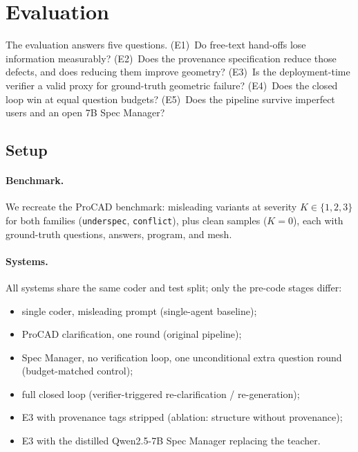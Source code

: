 \section{Evaluation}\label{sec:evaluation}

The evaluation answers five questions. (E1)~Do free-text hand-offs lose
information measurably? (E2)~Does the provenance specification reduce those
defects, and does reducing them improve geometry? (E3)~Is the
deployment-time verifier a valid proxy for ground-truth geometric failure?
(E4)~Does the closed loop win at equal question budgets? (E5)~Does the
pipeline survive imperfect users and an open 7B Spec Manager?

\subsection{Setup}\label{sec:evaluation:setup}

\paragraph{Benchmark.}
We recreate the ProCAD benchmark: misleading variants at severity
$K{\in}\{1,2,3\}$ for both families (\texttt{underspec},
\texttt{conflict}), plus clean samples ($K{=}0$), each with
ground-truth questions, answers, program, and mesh.

\paragraph{Systems.}
All systems share the same coder and test split; only the pre-code stages
differ:
\begin{itemize}\setlength\itemsep{0.1em}
  \item[\textbf{E0}] single coder, misleading prompt (single-agent baseline);
  \item[\textbf{E1}] ProCAD clarification, one round (original pipeline);
  \item[\textbf{E2}] Spec Manager, no verification loop, one unconditional
  extra question round (budget-matched control);
  \item[\textbf{E3}] full closed loop (verifier-triggered re-clarification /
  re-generation);
  \item[\textbf{E4}] E3 with provenance tags stripped (ablation:
  structure without provenance);
  \item[\textbf{E5}] E3 with the distilled Qwen2.5-7B Spec Manager replacing
  the teacher.
\end{itemize}

